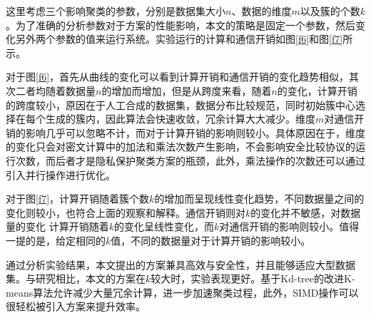 这里考虑三个影响聚类的参数，分别是数据集大小$ n $、数据的维度$ m $以及簇的个数$ k $。为了准确的分析参数对于方案的性能影响，本文的策略是固定一个参数，然后变化另外两个参数的值来运行系统。实验运行的计算和通信开销如图\ref{f6}和图\ref{f7}所示。

对于图\ref{f6}，首先从曲线的变化可以看到计算开销和通信开销的变化趋势相似，其次二者均随着数据量$ n $的增加而增加，但是从跨度来看，随着$ n $的变化，计算开销的跨度较小，原因在于人工合成的数据集，数据分布比较规范，同时初始簇中心选择在每个生成的簇内，因此算法会快速收敛，冗余计算大大减少。维度$ m $对通信开销的影响几乎可以忽略不计，而对于计算开销的影响则较小。具体原因在于，维度的变化只会对密文计算中的加法和乘法次数产生影响，不会影响安全比较协议的运行次数，而后者才是隐私保护聚类方案的瓶颈，此外，乘法操作的次数还可以通过引入并行操作进行优化。

对于图\ref{f7}，计算开销随着簇个数$ k $的增加而呈现线性变化趋势，不同数据量之间的变化则较小，也符合上面的观察和解释。通信开销则对$ k $的变化并不敏感，对数据量的变化
计算开销随着$ k $的变化呈线性变化，而$ k $对通信开销的影响则较小。值得一提的是，给定相同的$ k $值，不同的数据量对于计算开销的影响较小。

通过分析实验结果，本文提出的方案兼具高效与安全性，并且能够适应大型数据集。与研究\cite{wu2020secure,rong2017privacy}相比，本文的方案在$ k $较大时，实验表现更好。基于Kd-tree的改进K-means算法允许减少大量冗余计算，进一步加速聚类过程，此外，SIMD操作可以很轻松被引入方案来提升效率。

